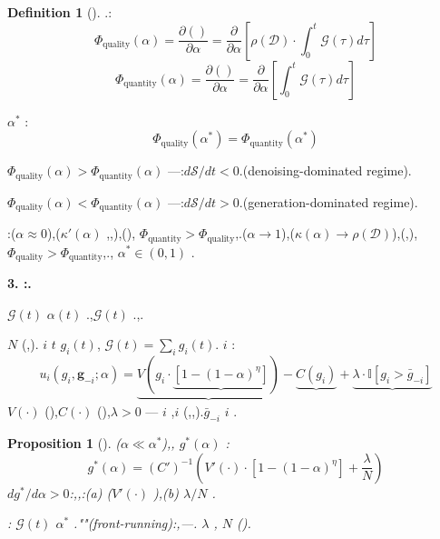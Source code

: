 \documentclass[12pt,a4paper]{article}
\newtheorem{proposition}[theorem]{Proposition}
\theoremstyle{definition}
\newtheorem{definition}{Definition}[section]
\theoremstyle{remark}
\begin{document}
\begin{definition}[]
.:
\begin{equation}
\Phi_{\text{quality}}(\alpha) = \frac{\partial (\text{})}{\partial \alpha} = \frac{\partial}{\partial \alpha}\left[\rho(\mathcal{D}) \cdot \int_0^t \mathcal{G}(\tau) d\tau\right]
\end{equation}
\begin{equation}
\Phi_{\text{quantity}}(\alpha) = \frac{\partial (\text{})}{\partial \alpha} = \frac{\partial}{\partial \alpha}\left[\int_0^t \mathcal{G}(\tau) d\tau\right]
\end{equation}

\textbf{} $\alpha^*$ :
\begin{equation}
\Phi_{\text{quality}}(\alpha^*) = \Phi_{\text{quantity}}(\alpha^*)
\end{equation}

 $\Phi_{\text{quality}}(\alpha) > \Phi_{\text{quantity}}(\alpha)$ ---:$d\mathcal{S}/dt < 0$.\textit{}(denoising-dominated regime).

 $\Phi_{\text{quality}}(\alpha) < \Phi_{\text{quantity}}(\alpha)$ ---:$d\mathcal{S}/dt > 0$.\textit{}(generation-dominated regime).

:($\alpha \approx 0$),($\kappa'(\alpha)$ ,,),(), $\Phi_{\text{quantity}} > \Phi_{\text{quality}}$,.($\alpha \to 1$),($\kappa(\alpha) \to \rho(\mathcal{D})$),(,), $\Phi_{\text{quality}} > \Phi_{\text{quantity}}$,., $\alpha^* \in (0, 1)$ .
\end{definition}

\medskip
\noindent\textbf{3. :.}

 $\mathcal{G}(t)$  $\alpha(t)$ .,$\mathcal{G}(t)$ \textit{}.,.

 $N$ (,). $i$  $t$  $g_i(t)$, $\mathcal{G}(t) = \sum_i g_i(t)$. $i$ :
\begin{equation}
u_i(g_i, \mathbf{g}_{-i}; \alpha) = \underbrace{V\left(g_i \cdot \underbrace{\left[1 - (1-\alpha)^{\eta}\right]}_{\text{}}\right)}_{\text{}} - \underbrace{C(g_i)}_{\text{}} + \underbrace{\lambda \cdot \mathbb{I}\left[g_i > \bar{g}_{-i}\right]}_{\text{}}
\end{equation}
 $V(\cdot)$ (),$C(\cdot)$ (),$\lambda > 0$ \textit{}--- $i$ ,$i$ (,,).$\bar{g}_{-i}$  $i$ .

\begin{proposition}[]
\label{prop:preemptive}
($\alpha \ll \alpha^*$),, $g^*(\alpha)$ :
\begin{equation}
g^*(\alpha) = (C')^{-1}\left(V'(\cdot) \cdot [1 - (1-\alpha)^{\eta}] + \frac{\lambda}{N}\right)
\end{equation}
 $dg^*/d\alpha > 0$:,\textit{},:(a) ($V'(\cdot)$ ),(b)  $\lambda/N$ .

\textit{}: $\mathcal{G}(t)$  $\alpha^*$ .""(front-running):,---. $\lambda$ , $N$ ().
\end{proposition}
\end{document}
